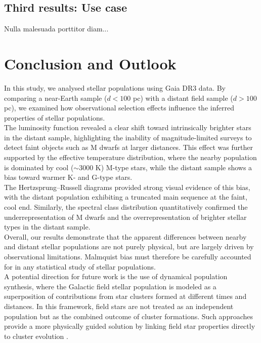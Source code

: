 \documentclass[11pt]{article}
\begin{document}
\subsection{Third results: Use case}
Nulla malesuada porttitor diam...

\section{Conclusion and Outlook}

In this study, we analysed stellar populations using Gaia DR3 data. By comparing a near-Earth sample ($d < 100$ pc) with a distant field sample ($d > 100$ pc), we examined how observational selection effects influence the inferred properties of stellar populations.\\

\noindent The luminosity function revealed a clear shift toward intrinsically brighter stars in the distant sample, highlighting the inability of magnitude-limited surveys to detect faint objects such as M dwarfs at larger distances. This effect was further supported by the effective temperature distribution, where the nearby population is dominated by cool ($\sim$3000 K) M-type stars, while the distant sample shows a bias toward warmer K- and G-type stars.\\

\noindent The Hertzsprung–Russell diagrams provided strong visual evidence of this bias, with the distant population exhibiting a truncated main sequence at the faint, cool end. Similarly, the spectral class distribution quantitatively confirmed the underrepresentation of M dwarfs and the overrepresentation of brighter stellar types in the distant sample.\\

\noindent Overall, our results demonstrate that the apparent differences between nearby and distant stellar populations are not purely physical, but are largely driven by observational limitations. Malmquist bias must therefore be carefully accounted for in any statistical study of stellar populations.\\

\noindent A potential direction for future work is the use of dynamical population synthesis, where the Galactic field stellar population is modeled as a superposition of contributions from star clusters formed at different times and distances. In this framework, field stars are not treated as an independent population but as the combined outcome of cluster formations. Such approaches provide a more physically guided solution by linking field star properties directly to cluster evolution \cite{Marks2011}.
\end{document}
